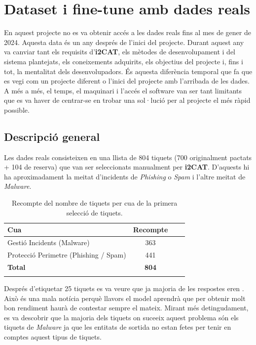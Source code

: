 \section{Dataset i fine-tune amb dades reals}
En aquest projecte no es va obtenir accés a les dades reals fins al mes de gener de 2024. Aquesta data és un any després de l'inici del projecte. Durant aquest any va canviar tant els requisits d'\textbf{i2CAT}, els mètodes de desenvolupament i del sistema plantejats, els coneixements adquirits, els objectius del projecte i, fins i tot, la mentalitat dels desenvolupadors. És aquesta diferència temporal que fa que es vegi com un projecte diferent o l'inici del projecte amb l'arribada de les dades. A més a més, el temps, el maquinari i l'accés el software van ser tant limitants que es va haver de centrar-se en trobar una sol·lució per al projecte el més ràpid possible.

\subsection{Descripció general}
Les dades reals consisteixen en una llista de 804 tiquets (700 originalment pactats + 104 de reserva) que van ser seleccionats manualment per \textbf{i2CAT}. D'aquests hi ha aproximadament la meitat d'incidents de \textit{Phishing} o \textit{Spam} i l'altre meitat de \textit{Malware}.

\begin{table}[H]
    \centering
    \begin{tabular}{lccr}
        \Xhline{2\arrayrulewidth}
        \textbf{Cua} & \textbf{Recompte} \\
        \hline
        Gestió Incidents (Malware) & 363 \\
        Protecció Perimetre (Phishing / Spam) & 441  \\
        \hline
        \textbf{Total} & \textbf{804} \\
        \Xhline{2\arrayrulewidth}
    \end{tabular}
    \caption{Recompte del nombre de tiquets per cua de la primera selecció de tiquets.}
    \label{tab:recompte_per_cua}
\end{table}

Després d'etiquetar 25 tiquets es va veure que ja majoria de les respostes eren . Això és una mala notícia perquè llavors el model aprendrà que per obtenir molt bon rendiment haurà de contestar sempre el mateix. Mirant més detingudament, es va descobrir que la majoria dels tiquets on suceeix aquest problema són els tiquets de \textit{Malware} ja que les entitats de sortida no estan fetes per tenir en comptes aquest tipus de tiquets.

